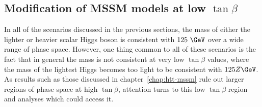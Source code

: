\subsection{Modification of MSSM models at low $\tan\beta$}
\label{sec:lowtanbscenario}

In all of the scenarios discussed in the previous sections, the mass of either
the lighter or heavier scalar Higgs boson is consistent with $125~\GeV$ over a
wide range of phase space. However, one thing common to all of these scenarios
is the fact that in general the mass is not consistent at very low $\tan\beta$
values, where the mass of the lightest Higgs becomes too light to be consistent
with $125Z\GeV$. As results such as those discussed in chapter~\ref{chap:htt-mssm} 
rule out larger regions of phase space at high $\tan\beta$, attention turns to this low
$\tan\beta$ region and analyses which could access it. 



